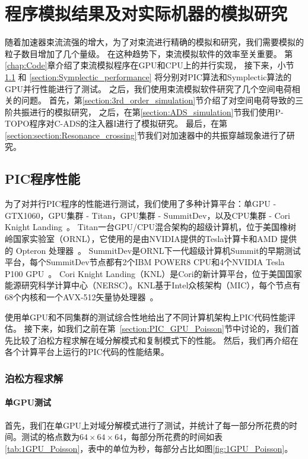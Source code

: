 \chapter{程序模拟结果及对实际机器的模拟研究} \label{chap:Simulation}
随着加速器束流流强的增大，为了对束流进行精确的模拟和研究，我们需要模拟的粒子数目增加了几个量级。
在这种趋势下，束流模拟软件的效率至关重要。
第\ref{chap:Code}章介绍了束流模拟程序在GPU和CPU上的并行实现，
接下来，小节\ref{section:PIC_performance} 和 \ref{section:Symplectic_performance} 将分别对PIC算法和Symplectic算法的GPU并行性能进行了测试。
之后，我们使用束流模拟软件研究了几个空间电荷相关的问题。
首先，第\ref{section:3rd_order_simulation}节介绍了对空间电荷导致的三阶共振进行的模拟研究，
之后，在第\ref{section:ADS_simulation}节我们使用P-TOPO程序对C-ADS的注入器I进行了模拟研究。
最后，在第\ref{section:section:Resonance_crossing}节我们对加速器中的共振穿越现象进行了研究。
\section{PIC程序性能}             \label{section:PIC_performance}
为了对并行PIC程序的性能进行测试，我们使用了多种计算平台：单GPU - GTX1060，GPU集群 - Titan，GPU集群 - SummitDev，以及CPU集群 - Cori Knight Landing~\cite{tiwari2015Titan,wells2016Summit,he2018Cori}。
Titan一台GPU/CPU混合架构的超级计算机，位于美国橡树岭国家实验室（ORNL），它使用的是由NVIDIA提供的Tesla计算卡和AMD 提供的 Opteron 处理器~\cite{TitanURL}。
SummitDev是ORNL下一代超级计算机Summit的早期测试平台，每个SummitDev节点都有2个IBM POWER8 CPU和4个NVIDIA Tesla P100 GPU~\cite{SummitURL}。
Cori Knight Landing（KNL）是Cori的新计算平台，位于美国国家能源研究科学计算中心（NERSC）。KNL基于Intel众核架构（MIC），每个节点有68个内核和一个AVX-512矢量协处理器~\cite{KnlURL}。

使用单GPU和不同集群的测试综合性地给出了不同计算机架构上PIC代码性能评估。
接下来，如我们之前在第~\ref{section:PIC_GPU_Poisson}节中讨论的，我们首先比较了泊松方程求解在域分解模式和复制模式下的性能。
然后，我们再介绍在各个计算平台上运行的PIC代码的性能结果。

\subsection{泊松方程求解}
\label{section:PIC_performance_Poisson}

\subsubsection{单GPU测试}
首先，我们在单GPU上对域分解模式进行了测试，并统计了每一部分所花费的时间。测试的格点数为$64 \times 64 \times 64$，每部分所花费的时间如表\ref{tab:1GPU_Poisson}，表中的单位为秒，每部分占比如图\ref{fig:1GPU_Poisson}。

